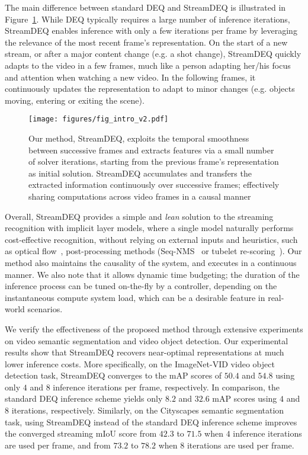 \documentclass[runningheads]{llncs}
\begin{document}
The main difference between standard DEQ and StreamDEQ is illustrated in Figure~\ref{fig:intro_figure}. While DEQ typically requires a large number of inference iterations, StreamDEQ enables inference with only a few iterations per frame by leveraging the relevance of the most recent frame's representation. On the start of a new stream, or after a major content change (e.g. a shot change), StreamDEQ quickly adapts to the video in a few frames, much like a person adapting her/his focus and attention when watching a new video. In the following frames, it continuously updates the representation to adapt to minor changes (e.g. objects moving, entering or exiting the scene). 


\begin{figure}[t]
\centering
\texttt{[image: figures/fig\_intro\_v2.pdf]}
\caption{Our method, StreamDEQ, exploits the temporal smoothness between successive frames and extracts features via a small number of solver iterations, starting from the previous frame’s representation as initial solution. StreamDEQ accumulates and transfers the extracted information continuously over successive frames; effectively sharing computations across video frames in a causal manner}
\label{fig:intro_figure}
\end{figure}


Overall, StreamDEQ provides a simple and {\em lean} solution to the streaming recognition with implicit layer models, where a single model naturally performs cost-effective recognition, without relying on external inputs and heuristics, such as optical flow~\cite{horn1981determining}, post-processing methods (Seq-NMS~\cite{han2016seq} or tubelet re-scoring~\cite{kang2016object,kang2017tubelets}). Our method also maintains the causality of the system, and executes in a continuous manner. We also note that it allows dynamic time budgeting; the duration of the inference process can be tuned on-the-fly by a controller, depending on the instantaneous compute system load, which can be a desirable feature in real-world scenarios.


We verify the effectiveness of the proposed method through extensive experiments on video semantic segmentation and video object detection. Our experimental results show that StreamDEQ recovers near-optimal representations at much lower inference costs. More specifically, on the ImageNet-VID video object detection task, StreamDEQ converges to the mAP scores of $50.4$ and $54.8$ using only $4$ and $8$ inference iterations per frame, respectively. In comparison, the standard DEQ inference scheme yields only $8.2$ and $32.6$ mAP scores using $4$ and $8$ iterations, respectively. Similarly, on the Cityscapes semantic segmentation task, using StreamDEQ instead of the standard DEQ inference scheme improves the converged streaming mIoU score from $42.3$ to $71.5$ when $4$ inference iterations are used per frame, and from $73.2$ to $78.2$ when $8$ iterations are used per frame. 
\end{document}
